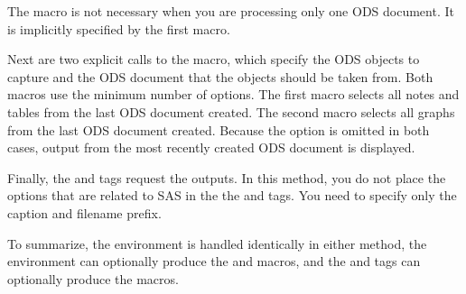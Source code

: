 \documentclass[article,oneside]{memoir}
\begin{document}
  The  macro is not necessary when you are processing
  only one ODS document. It is implicitly specified by the first  macro.

  Next are two explicit calls to the  macro, which
  specify the ODS objects to capture and the ODS document that the objects
  should be taken from.
  Both  macros use the minimum number of options.
  The first  macro selects all
  notes and tables from the last ODS document created. The second  macro
  selects all graphs from the last ODS document created.
  Because the  option is omitted in both cases,
  output from the most recently created ODS document is displayed.

  Finally, the  and  tags request the outputs.
  In
  this method, you do not place the options that are related to SAS in the
  the  and  tags. You need to
  specify only the caption and filename prefix.


  To summarize, the  environment is handled identically in either method,
  the  environment can optionally produce the  and  macros,
  and the  and  tags can optionally produce the  macros.
\end{document}
